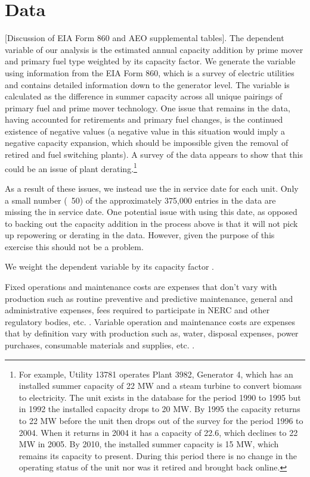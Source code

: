 \documentclass[10pt]{amsart}
\begin{document}
\section{Data}
[Discussion of EIA Form 860 and AEO supplemental tables].
The dependent variable of our analysis is the estimated annual capacity addition by prime mover and primary fuel type weighted by its capacity factor.
We generate the variable using information from the EIA Form 860, which is a survey of electric utilities and contains detailed information down to the generator level.
The variable is calculated as the difference in summer capacity across all unique pairings of primary fuel and prime mover technology.
One issue that remains in the data, having accounted for retirements and primary fuel changes, is the continued existence of negative values (a negative value in this situation would imply a negative capacity expansion, which should be impossible given the removal of retired and fuel switching plants).
A survey of the data appears to show that this could be an issue of plant derating.\footnote{For example, Utility 13781 operates Plant 3982, Generator 4, which has an installed summer capacity of 22 MW and a steam turbine to convert biomass to electricity. The unit exists in the database for the period 1990 to 1995 but in 1992 the installed capacity drops to 20 MW. By 1995 the capacity returns to 22 MW before the unit then drops out of the survey for the period 1996 to 2004. When it returns in 2004 it has a capacity of 22.6, which declines to 22 MW in 2005. By 2010, the installed summer capacity is 15 MW, which remains its capacity to present. During this period there is no change in the operating status of the unit nor was it retired and brought back online.} 

As a result of these issues, we instead use the in service date for each unit. 
Only a small number (~50) of the approximately 375,000 entries in the data are missing the in service date.
One potential issue with using this date, as opposed to backing out the capacity addition in the process above is that it will not pick up repowering or derating in the data.
However, given the purpose of this exercise this should not be a problem. 
  
We weight the dependent variable by its capacity factor \parencite{eiapower2016,eiapower2014}.

Fixed operations and maintenance costs are expenses that don't vary with production such as routine preventive and predictive maintenance, general and administrative expenses, fees required to participate in NERC and other regulatory bodies, etc. \parencite{eiaupdatedcapital2010}.
Variable operation and maintenance costs are expenses that by definition vary with production such as, water, disposal expenses, power purchases, consumable materials and supplies, etc. \parencite{eiaupdatedcapital2010}.   
\end{document}
